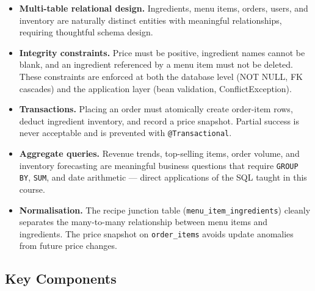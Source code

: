\documentclass[12pt,a4paper]{article}
\begin{document}
\begin{itemize}
    \item \textbf{Multi-table relational design.} Ingredients, menu items, orders,
          users, and inventory are naturally distinct entities with meaningful
          relationships, requiring thoughtful schema design.

    \item \textbf{Integrity constraints.} Price must be positive, ingredient names
          cannot be blank, and an ingredient referenced by a menu item must not be
          deleted. These constraints are enforced at both the database level (NOT
          NULL, FK cascades) and the application layer (bean validation,
          ConflictException).

    \item \textbf{Transactions.} Placing an order must atomically create
          order-item rows, deduct ingredient inventory, and record a price
          snapshot. Partial success is never acceptable and is prevented with
          \texttt{@Transactional}.

    \item \textbf{Aggregate queries.} Revenue trends, top-selling items, order
          volume, and inventory forecasting are meaningful business questions
          that require \texttt{GROUP BY}, \texttt{SUM}, and date arithmetic ---
          direct applications of the SQL taught in this course.

    \item \textbf{Normalisation.} The recipe junction table
          (\texttt{menu\_item\_ingredients}) cleanly separates the many-to-many
          relationship between menu items and ingredients. The price snapshot on
          \texttt{order\_items} avoids update anomalies from future price changes.
\end{itemize}

\subsection{Key Components}
\end{document}
